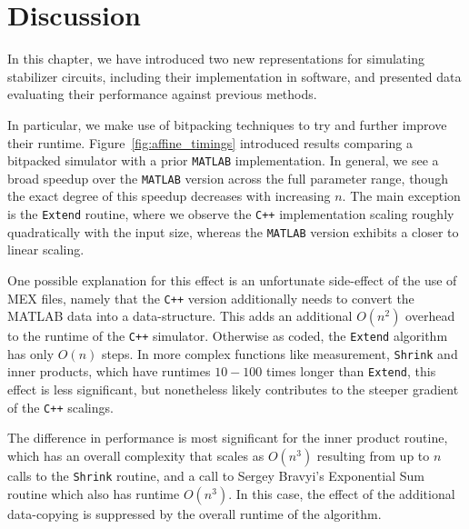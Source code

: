 \section{Discussion}
In this chapter, we have introduced two new representations for simulating stabilizer circuits, including their implementation in software, and presented data evaluating their performance against previous methods.\par
In particular, we make use of bitpacking techniques to try and further improve their runtime. Figure~\ref{fig:affine_timings} introduced results comparing a bitpacked simulator with a prior \texttt{MATLAB} implementation. In general, we see a broad speedup over the \texttt{MATLAB} version across the full parameter range, though the exact degree of this speedup decreases with increasing $n$. The main exception is the \texttt{Extend} routine, where we observe the \texttt{C++} implementation scaling roughly quadratically with the input size, whereas the \texttt{MATLAB} version exhibits a closer to linear scaling.\par
One possible explanation for this effect is an unfortunate side-effect of the use of MEX files, namely that the \texttt{C++} version additionally needs to convert the MATLAB data into a  data-structure. This adds an additional $O(n^{2})$ overhead to the runtime of the \texttt{C++} simulator. Otherwise as coded, the \texttt{Extend} algorithm has only $O(n)$ steps. In more complex functions like measurement, \texttt{Shrink} and inner products, which have runtimes $10-100$ times longer than \texttt{Extend}, this effect is less significant, but nonetheless likely contributes to the steeper gradient of the \texttt{C++} scalings.\par
The difference in performance is most significant for the inner product routine, which has an overall complexity that scales as $O(n^{3})$ resulting from up to $n$ calls to the \texttt{Shrink} routine, and a call to Sergey Bravyi's Exponential Sum routine which also has runtime $O(n^{3})$. In this case, the effect of the additional data-copying is suppressed by the overall runtime of the algorithm. \par
